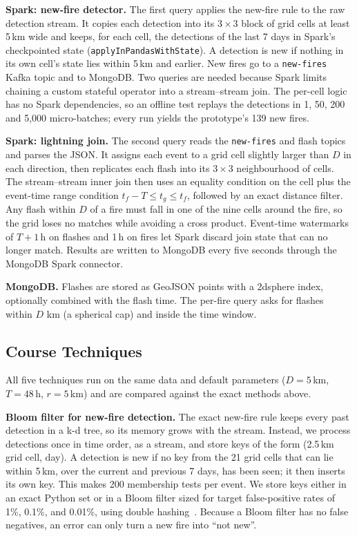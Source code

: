 \documentclass[10pt,journal,compsoc]{IEEEtran}
\begin{document}
\textbf{Spark: new-fire detector.} The first query applies the new-fire rule to the raw detection stream. It copies each detection into its $3 \times 3$ block of grid cells at least 5\,km wide and keeps, for each cell, the detections of the last 7 days in Spark's checkpointed state (\texttt{applyInPandasWithState}). A detection is new if nothing in its own cell's state lies within 5\,km and earlier. New fires go to a \texttt{new-fires} Kafka topic and to MongoDB. Two queries are needed because Spark limits chaining a custom stateful operator into a stream--stream join. The per-cell logic has no Spark dependencies, so an offline test replays the detections in 1, 50, 200 and 5,000 micro-batches; every run yields the prototype's 139 new fires.

\textbf{Spark: lightning join.} The second query reads the \texttt{new-fires} and flash topics and parses the JSON. It assigns each event to a grid cell slightly larger than $D$ in each direction, then replicates each flash into its $3 \times 3$ neighbourhood of cells. The stream--stream inner join then uses an equality condition on the cell plus the event-time range condition $t_f - T \le t_g \le t_f$, followed by an exact distance filter. Any flash within $D$ of a fire must fall in one of the nine cells around the fire, so the grid loses no matches while avoiding a cross product. Event-time watermarks of $T{+}1$\,h on flashes and 1\,h on fires let Spark discard join state that can no longer match. Results are written to MongoDB every five seconds through the MongoDB Spark connector.

\textbf{MongoDB.} Flashes are stored as GeoJSON points with a 2dsphere index, optionally combined with the flash time. The per-fire query asks for flashes within $D$ km (a spherical cap) and inside the time window.

\subsection{Course Techniques}\label{sec:coursemethods}
All five techniques run on the same data and default parameters ($D = 5$\,km, $T = 48$\,h, $r = 5$\,km) and are compared against the exact methods above.

\textbf{Bloom filter for new-fire detection.} The exact new-fire rule keeps every past detection in a k-d tree, so its memory grows with the stream. Instead, we process detections once in time order, as a stream, and store keys of the form (2.5\,km grid cell, day). A detection is new if no key from the 21 grid cells that can lie within 5\,km, over the current and previous 7 days, has been seen; it then inserts its own key. This makes 200 membership tests per event. We store keys either in an exact Python set or in a Bloom filter sized for target false-positive rates of 1\%, 0.1\%, and 0.01\%, using double hashing~\cite{kirsch2006lesshashing}. Because a Bloom filter has no false negatives, an error can only turn a new fire into ``not new''.
\end{document}
